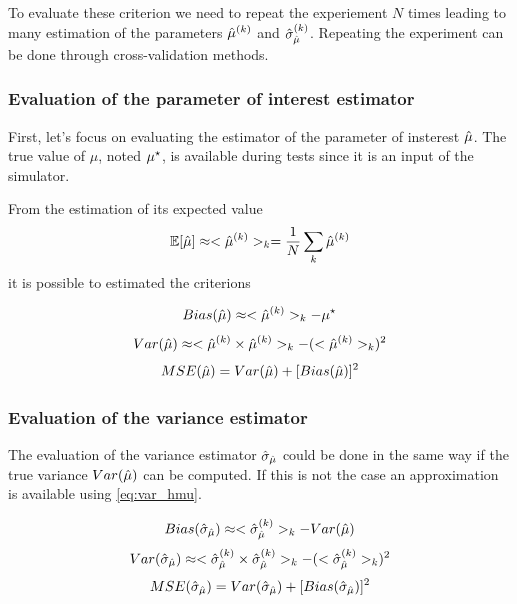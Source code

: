 To evaluate these criterion we need to repeat the experiement $N$ times leading to many estimation of the parameters $\hat\mu^{(k)}$ and $\hat\sigma_{\hat\mu}^{(k)}$.
Repeating the experiment can be done through cross-validation methods.







\subsubsection{Evaluation of the parameter of interest estimator} %
\label{ssub:evaluation_of_the_parameter_of_interest_estimator}

First, let's focus on evaluating the estimator of the parameter of insterest $\hat\mu$.
The true value of $\mu$, noted $\mu^\star$, is available during tests since it is an input of the simulator.

From the estimation of its expected value
\begin{equation}
  \mathbb{E}[\hat\mu] \approx <\hat\mu^{(k)}>_k = \frac{1}{N} \sum_{k} \hat\mu^{(k)}
\end{equation}
it is possible to estimated the criterions

\begin{equation}
  Bias(\hat\mu) \approx <\hat\mu^{(k)}>_k - \mu^\star
\end{equation}
\begin{equation}
  \label{eq:var_hmu}
  Var(\hat\mu) \approx <\hat\mu^{(k)} \times \hat\mu^{(k)}>_k - (<\hat\mu^{(k)}>_k)^2
\end{equation}
\begin{equation}
  MSE(\hat\mu) = Var(\hat\mu) + [Bias(\hat\mu)]^2
\end{equation}






\subsubsection{Evaluation of the variance estimator} %
\label{ssub:evaluation_of_the_variance_estimator}

The evaluation of the variance estimator $\hat\sigma_{\hat\mu}$ could be done in the same way if the true variance $Var(\hat\mu)$ can be computed.
If this is not the case an approximation is available using \autoref{eq:var_hmu}.

\begin{equation}
  Bias(\hat\sigma_{\hat\mu}) \approx <\hat\sigma_{\hat\mu}^{(k)}>_k - Var(\hat\mu)
\end{equation}
\begin{equation}
  Var(\hat\sigma_{\hat\mu}) \approx <\hat\sigma_{\hat\mu}^{(k)} \times \hat\sigma_{\hat\mu}^{(k)}>_k - (<\hat\sigma_{\hat\mu}^{(k)}>_k)^2
\end{equation}
\begin{equation}
  MSE(\hat\sigma_{\hat\mu}) = Var(\hat\sigma_{\hat\mu}) + [Bias(\hat\sigma_{\hat\mu})]^2
\end{equation}







